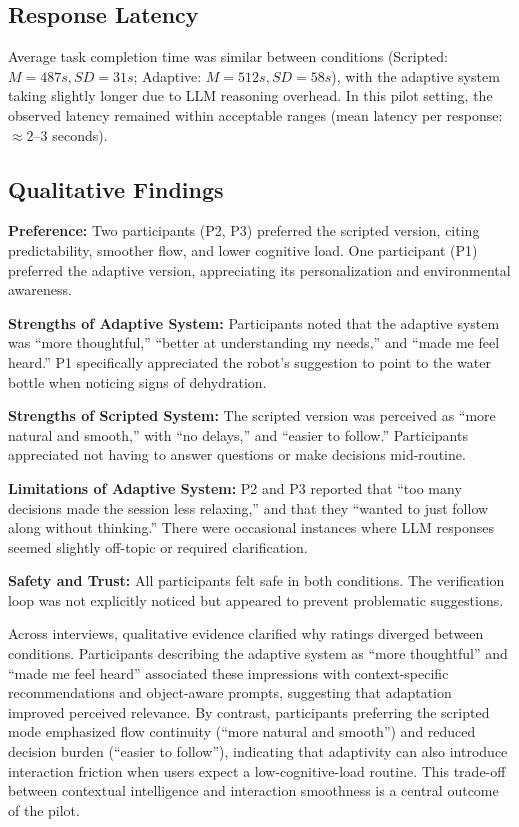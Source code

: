 \subsection{Response Latency}

Average task completion time was similar between conditions (Scripted: $M=487s, SD=31s$; Adaptive: $M=512s, SD=58s$), with the adaptive system taking slightly longer due to LLM reasoning overhead. In this pilot setting, the observed latency remained within acceptable ranges (mean latency per response: $\approx2$–$3$ seconds).

\subsection{Qualitative Findings}

\textbf{Preference:} Two participants (P2, P3) preferred the scripted version, citing predictability, smoother flow, and lower cognitive load. One participant (P1) preferred the adaptive version, appreciating its personalization and environmental awareness.

\textbf{Strengths of Adaptive System:} Participants noted that the adaptive system was ``more thoughtful,'' ``better at understanding my needs,'' and ``made me feel heard.'' P1 specifically appreciated the robot's suggestion to point to the water bottle when noticing signs of dehydration.

\textbf{Strengths of Scripted System:} The scripted version was perceived as ``more natural and smooth,'' with ``no delays,'' and ``easier to follow.'' Participants appreciated not having to answer questions or make decisions mid-routine.

\textbf{Limitations of Adaptive System:} P2 and P3 reported that ``too many decisions made the session less relaxing,'' and that they ``wanted to just follow along without thinking.'' There were occasional instances where LLM responses seemed slightly off-topic or required clarification.

\textbf{Safety and Trust:} All participants felt safe in both conditions. The verification loop was not explicitly noticed but appeared to prevent problematic suggestions.

Across interviews, qualitative evidence clarified why ratings diverged between conditions. Participants describing the adaptive system as ``more thoughtful'' and ``made me feel heard'' associated these impressions with context-specific recommendations and object-aware prompts, suggesting that adaptation improved perceived relevance. By contrast, participants preferring the scripted mode emphasized flow continuity (``more natural and smooth'') and reduced decision burden (``easier to follow''), indicating that adaptivity can also introduce interaction friction when users expect a low-cognitive-load routine. This trade-off between contextual intelligence and interaction smoothness is a central outcome of the pilot.

